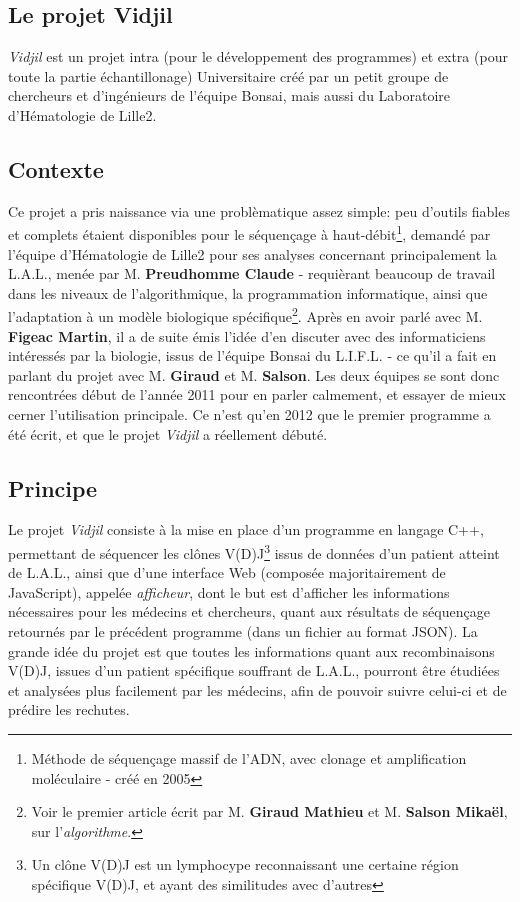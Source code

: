 \documentclass[12pt]{report}
\begin{document}
\begin{spacing}{1.2}
\section{Le projet Vidjil}

\textit{Vidjil} est un projet intra (pour le développement des programmes) et extra (pour toute la partie échantillonage) Universitaire créé par un petit groupe de chercheurs et d'ingénieurs de l'équipe Bonsai, mais aussi du Laboratoire d'Hématologie de Lille2.
\subsection{Contexte}
Ce projet a pris naissance via une problèmatique assez simple: peu d'outils fiables et complets étaient disponibles pour le séquençage à haut-débit\footnote{Méthode de séquençage massif de l'ADN, avec clonage et amplification moléculaire - créé en 2005}, demandé par l'équipe d'Hématologie de Lille2 pour ses analyses concernant principalement la L.A.L., menée par M. \textbf{Preudhomme Claude} - requièrant beaucoup de travail dans les niveaux de l'algorithmique, la programmation informatique, ainsi que l'adaptation à un modèle biologique spécifique\footnote{Voir le premier article écrit par M. \textbf{Giraud Mathieu} et M. \textbf{Salson Mikaël}, sur l'\textit{algorithme}.}.
\newline
Après en avoir parlé avec M. \textbf{Figeac Martin}, il a de suite émis l'idée d'en discuter avec des informaticiens intéressés par la biologie, issus de l'équipe Bonsai du L.I.F.L. - ce qu'il a fait en parlant du projet avec M. \textbf{Giraud} et M. \textbf{Salson}.
\newline
Les deux équipes se sont donc rencontrées début de l'année 2011 pour en parler calmement, et essayer de mieux cerner l'utilisation principale. Ce n'est qu'en 2012 que le premier programme a été écrit, et que le projet \textit{Vidjil} a réellement débuté.

\subsection{Principe}
Le projet \textit{Vidjil} consiste à la mise en place d'un programme en langage C++, permettant de séquencer les clônes V(D)J\footnote{Un clône V(D)J est un lymphocype reconnaissant une certaine région spécifique V(D)J, et ayant des similitudes avec d'autres} issus de données d'un patient atteint de L.A.L., ainsi que d'une interface Web (composée majoritairement de JavaScript), appelée \textit{afficheur}, dont le but est d'afficher les informations nécessaires pour les médecins et chercheurs, quant aux résultats de séquençage retournés par le précédent programme (dans un fichier au format JSON).
\newline
La grande idée du projet est que toutes les informations quant aux recombinaisons V(D)J, issues d'un patient spécifique souffrant de L.A.L., pourront être étudiées et analysées plus facilement par les médecins, afin de pouvoir suivre celui-ci et de prédire les rechutes.


\end{spacing}
\end{document}
